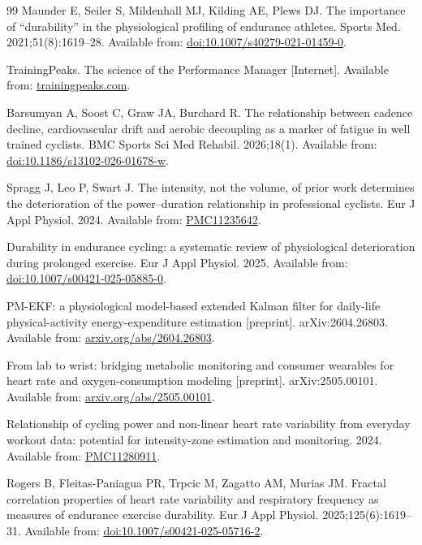 \documentclass[11pt]{article}
\begin{document}
\begin{thebibliography}{99}
 Maunder E, Seiler S, Mildenhall MJ, Kilding AE, Plews DJ. The importance of ``durability'' in the physiological profiling of endurance athletes. Sports Med. 2021;51(8):1619--28. Available from: \href{https://link.springer.com/article/10.1007/s40279-021-01459-0}{doi:10.1007/s40279-021-01459-0}.

 TrainingPeaks. The science of the Performance Manager [Internet]. Available from: \href{https://www.trainingpeaks.com/learn/articles/the-science-of-the-performance-manager/}{trainingpeaks.com}.

 Barsumyan A, Soost C, Graw JA, Burchard R. The relationship between cadence decline, cardiovascular drift and aerobic decoupling as a marker of fatigue in well trained cyclists. BMC Sports Sci Med Rehabil. 2026;18(1). Available from: \href{https://doi.org/10.1186/s13102-026-01678-w}{doi:10.1186/s13102-026-01678-w}.

 Spragg J, Leo P, Swart J. The intensity, not the volume, of prior work determines the deterioration of the power--duration relationship in professional cyclists. Eur J Appl Physiol. 2024. Available from: \href{https://pmc.ncbi.nlm.nih.gov/articles/PMC11235642/}{PMC11235642}.

 Durability in endurance cycling: a systematic review of physiological deterioration during prolonged exercise. Eur J Appl Physiol. 2025. Available from: \href{https://link.springer.com/article/10.1007/s00421-025-05885-0}{doi:10.1007/s00421-025-05885-0}.

 PM-EKF: a physiological model-based extended Kalman filter for daily-life physical-activity energy-expenditure estimation [preprint]. arXiv:2604.26803. Available from: \href{https://arxiv.org/abs/2604.26803}{arxiv.org/abs/2604.26803}.

 From lab to wrist: bridging metabolic monitoring and consumer wearables for heart rate and oxygen-consumption modeling [preprint]. arXiv:2505.00101. Available from: \href{https://arxiv.org/abs/2505.00101}{arxiv.org/abs/2505.00101}.

 Relationship of cycling power and non-linear heart rate variability from everyday workout data: potential for intensity-zone estimation and monitoring. 2024. Available from: \href{https://pmc.ncbi.nlm.nih.gov/articles/PMC11280911/}{PMC11280911}.

 Rogers B, Fleitas-Paniagua PR, Trpcic M, Zagatto AM, Murias JM. Fractal correlation properties of heart rate variability and respiratory frequency as measures of endurance exercise durability. Eur J Appl Physiol. 2025;125(6):1619--31. Available from: \href{https://doi.org/10.1007/s00421-025-05716-2}{doi:10.1007/s00421-025-05716-2}.


\end{thebibliography}
\end{document}
